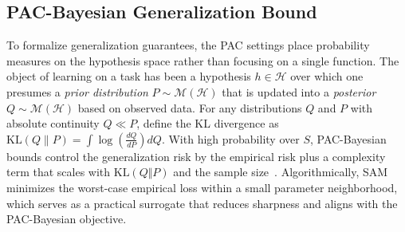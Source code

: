 \documentclass[10pt]{article} %
\begin{document}
\subsection{PAC-Bayesian Generalization Bound}



To formalize generalization guarantees, the PAC settings place probability measures on the hypothesis space rather than focusing on a single function. The object of learning on a task has been a hypothesis $h \in \mathcal{H}$ over which one presumes a \textit{prior distribution} $P\sim \mathcal{M}(\mathcal{H})$ that is updated into a \textit{posterior} $Q\sim \mathcal{M}(\mathcal{H})$ based on observed data. For any distributions \(Q\) and \(P\) with absolute continuity \(Q \ll P\), define the KL divergence as \(\mathrm{KL}(Q \| P) = \int \log\left( \frac{dQ}{dP} \right) dQ\). With high probability over $S$, PAC-Bayesian bounds control the generalization risk  by the empirical risk plus a complexity term that scales with $\mathrm{KL}(Q\Vert P)$ and the sample size~\citep{shawe1997pac,mcallesterPACBayesianStochasticModel2003}.  Algorithmically, SAM~\citep{foretSharpnessAwareMinimizationEfficiently2021} minimizes the worst-case empirical loss within a small parameter neighborhood, which serves as a practical surrogate that reduces sharpness and aligns with the PAC-Bayesian objective.


\end{document}

